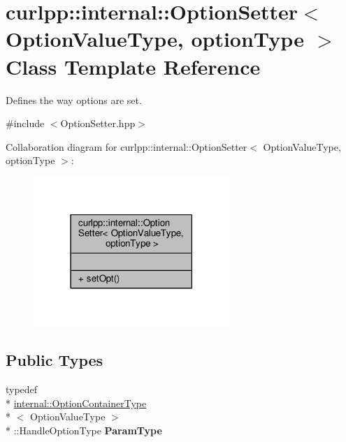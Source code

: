\hypertarget{classcurlpp_1_1internal_1_1OptionSetter}{\section{curlpp\-:\-:internal\-:\-:Option\-Setter$<$ Option\-Value\-Type, option\-Type $>$ Class Template Reference}
\label{classcurlpp_1_1internal_1_1OptionSetter}
}


Defines the way options are set.  




{\ttfamily \#include $<$Option\-Setter.\-hpp$>$}



Collaboration diagram for curlpp\-:\-:internal\-:\-:Option\-Setter$<$ Option\-Value\-Type, option\-Type $>$\-:
\nopagebreak
\begin{figure}[H]
\begin{center}
\leavevmode
\includegraphics[width=210pt]{classcurlpp_1_1internal_1_1OptionSetter__coll__graph}
\end{center}
\end{figure}
\subsection*{Public Types}
\begin{DoxyCompactItemize}
\item 
\hypertarget{classcurlpp_1_1internal_1_1OptionSetter_aa434d2d90d6936737512d72aab4f94c4}{typedef \\*
\hyperlink{structcurlpp_1_1internal_1_1OptionContainerType}{internal\-::\-Option\-Container\-Type}\\*
$<$ Option\-Value\-Type $>$\\*
\-::Handle\-Option\-Type {\bfseries Param\-Type}}\label{classcurlpp_1_1internal_1_1OptionSetter_aa434d2d90d6936737512d72aab4f94c4}

\end{DoxyCompactItemize}
